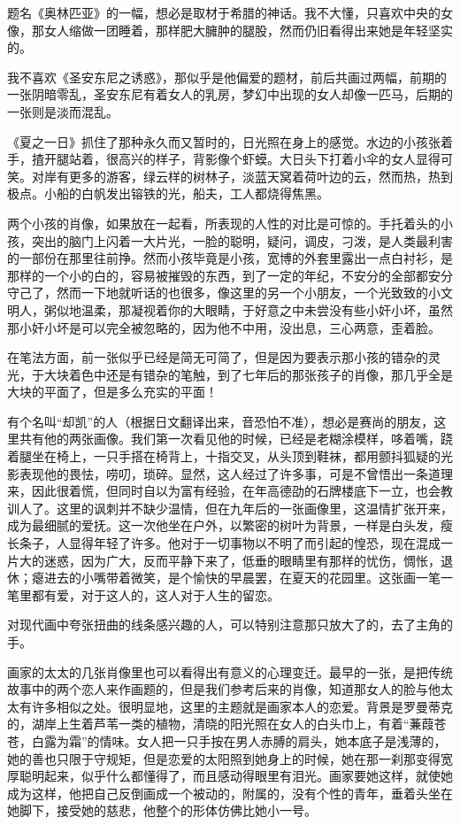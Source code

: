 \par 题名《奥林匹亚》的一幅，想必是取材于希腊的神话。我不大懂，只喜欢中央的女像，那女人缩做一团睡着，那样肥大臃肿的腿股，然而仍旧看得出来她是年轻坚实的。
\par 我不喜欢《圣安东尼之诱惑》，那似乎是他偏爱的题材，前后共画过两幅，前期的一张阴暗零乱，圣安东尼有着女人的乳房，梦幻中出现的女人却像一匹马，后期的一张则是淡而混乱。
\par 《夏之一日》抓住了那种永久而又暂时的，日光照在身上的感觉。水边的小孩张着手，揸开腿站着，很高兴的样子，背影像个虾蟆。大日头下打着小伞的女人显得可笑。对岸有更多的游客，绿云样的树林子，淡蓝天窝着荷叶边的云，然而热，热到极点。小船的白帆发出镕铁的光，船夫，工人都烧得焦黑。
\par 两个小孩的肖像，如果放在一起看，所表现的人性的对比是可惊的。手托着头的小孩，突出的脑门上闪着一大片光，一脸的聪明，疑问，调皮，刁泼，是人类最利害的一部份在那里往前挣。然而小孩毕竟是小孩，宽博的外套里露出一点白衬衫，是那样的一个小的白的，容易被摧毁的东西，到了一定的年纪，不安分的全部都安分守己了，然而一下地就听话的也很多，像这里的另一个小朋友，一个光致致的小文明人，粥似地温柔，那凝视着你的大眼睛，于好意之中未尝没有些小奸小坏，虽然那小奸小坏是可以完全被忽略的，因为他不中用，没出息，三心两意，歪着脸。
\par 在笔法方面，前一张似乎已经是简无可简了，但是因为要表示那小孩的错杂的灵光，于大块着色中还是有错杂的笔触，到了七年后的那张孩子的肖像，那几乎全是大块的平面了，但是多么充实的平面！
\par 有个名叫“却凯”的人（根据日文翻译出来，音恐怕不准），想必是赛尚的朋友，这里共有他的两张画像。我们第一次看见他的时候，已经是老糊涂模样，哆着嘴，跷着腿坐在椅上，一只手搭在椅背上，十指交叉，从头顶到鞋袜，都用颤抖狐疑的光影表现他的畏怯，唠叨，琐碎。显然，这人经过了许多事，可是不曾悟出一条道理来，因此很着慌，但同时自以为富有经验，在年高德劭的石牌楼底下一立，也会教训人了。这里的讽刺并不缺少温情，但在九年后的一张画像里，这温情扩张开来，成为最细腻的爱抚。这一次他坐在户外，以繁密的树叶为背景，一样是白头发，瘦长条子，人显得年轻了许多。他对于一切事物以不明了而引起的惶恐，现在混成一片大的迷惑，因为广大，反而平静下来了，低垂的眼睛里有那样的忧伤，惆怅，退休；瘪进去的小嘴带着微笑，是个愉快的早晨罢，在夏天的花园里。这张画一笔一笔里都有爱，对于这人的，这人对于人生的留恋。
\par 对现代画中夸张扭曲的线条感兴趣的人，可以特别注意那只放大了的，去了主角的手。
\par 画家的太太的几张肖像里也可以看得出有意义的心理变迁。最早的一张，是把传统故事中的两个恋人来作画题的，但是我们参考后来的肖像，知道那女人的脸与他太太有许多相似之处。很明显地，这里的主题就是画家本人的恋爱。背景是罗曼蒂克的，湖岸上生着芦苇一类的植物，清晓的阳光照在女人的白头巾上，有着“蒹葭苍苍，白露为霜”的情味。女人把一只手按在男人赤膊的肩头，她本底子是浅薄的，她的善也只限于守规矩，但是恋爱的太阳照到她身上的时候，她在那一刹那变得宽厚聪明起来，似乎什么都懂得了，而且感动得眼里有泪光。画家要她这样，就使她成为这样，他把自己反倒画成一个被动的，附属的，没有个性的青年，垂着头坐在她脚下，接受她的慈悲，他整个的形体仿佛比她小一号。
